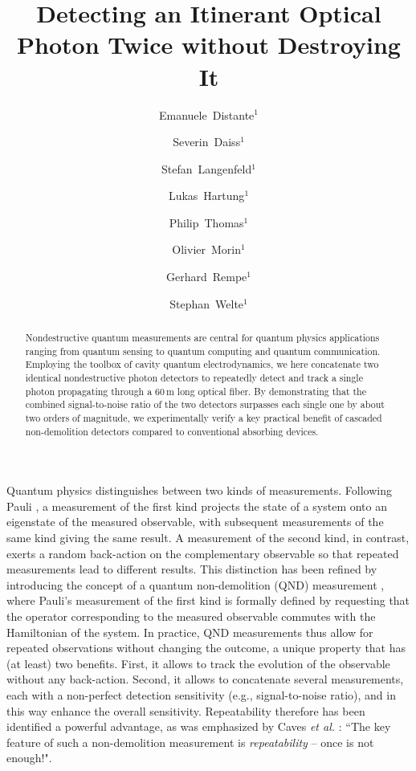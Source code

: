 \documentclass[prl,amsmath,amssymb,bibnotes,aps,longbibliography,12pt]{revtex4-1}
\begin{document}
\title{Detecting an Itinerant Optical Photon Twice without Destroying It}

\author{Emanuele~Distante$^{1}$}
\author{Severin~Daiss$^{1}$}
\author{Stefan~Langenfeld$^{1}$}
\author{Lukas~Hartung$^{1}$}
\author{Philip~Thomas$^{1}$}
\author{Olivier~Morin$^{1}$}
\author{Gerhard~Rempe$^{1}$}
\author{Stephan~Welte$^{1}$}

\begin{abstract}
\noindent Nondestructive quantum measurements are central for quantum physics applications ranging from quantum sensing to quantum computing and quantum communication. Employing the toolbox of cavity quantum electrodynamics, we here concatenate two identical nondestructive photon detectors to repeatedly detect and track a single photon propagating through a $60\,\mathrm{m}$ long optical fiber. By demonstrating that the combined signal-to-noise ratio of the two detectors surpasses each single one by about two orders of magnitude, we experimentally verify a key practical benefit of cascaded non-demolition detectors compared to conventional absorbing devices.
\end{abstract}

\maketitle \nocite{apsrev41Control}

\noindent Quantum physics distinguishes between two kinds of measurements. Following Pauli \cite{pauli1933}, a measurement of the first kind projects the state of a system onto an eigenstate of the measured observable, with subsequent measurements of the same kind giving the same result. A measurement of the second kind, in contrast, exerts a random back-action on the complementary observable so that repeated measurements lead to different results. This distinction has been refined by introducing the concept of a quantum non-demolition (QND) measurement \cite{braginsky1980,braginsky1996}, where Pauli's measurement of the first kind is formally defined by requesting that the operator corresponding to the measured observable commutes with the Hamiltonian of the system. In practice, QND measurements thus allow for repeated observations without changing the outcome, a unique property that has (at least) two benefits. First, it allows to track the evolution of the observable without any back-action. Second, it allows to concatenate several measurements, each with a non-perfect detection sensitivity (e.g., signal-to-noise ratio), and in this way enhance the overall sensitivity. Repeatability therefore has been identified a powerful advantage, as was emphasized by Caves \textit{et al.} \cite{caves1980}: ``The key feature of such a non-demolition measurement is \textit{repeatability} -- once is not enough!".
\end{document}
